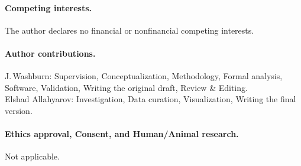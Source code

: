 \documentclass[aps,prd,onecolumn,amsmath,amssymb,superscriptaddress,nofootinbib,showpacs,showkeys]{revtex4-2}
\begin{document}
\paragraph{Competing interests.}
The author declares no financial or non\-financial competing interests.

\paragraph{Author contributions.}
J.\,Washburn: 
Supervision,
Conceptualization,
Methodology,
Formal analysis,
Software,
Validation,
Writing the original draft,
Review \& Editing. \\
Elshad Allahyarov: 
Investigation,
Data curation,
Visualization,
Writing the final version.  






\paragraph{Ethics approval, Consent, and Human/Animal research.}
Not applicable.

\end{document}
